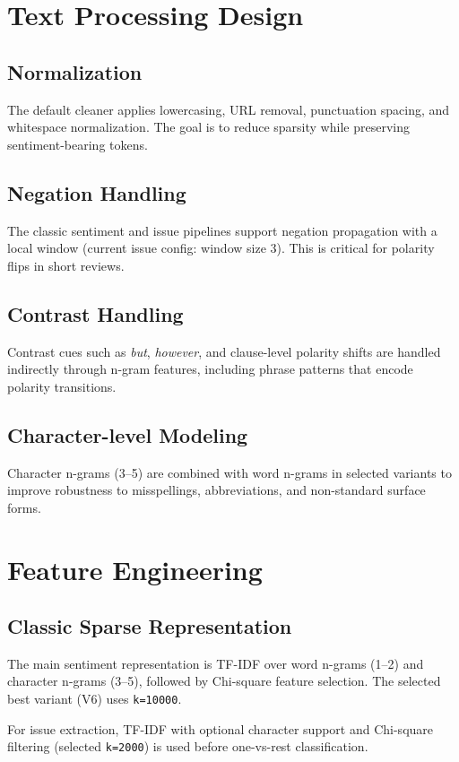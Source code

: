 \documentclass[12pt,a4paper]{article}
\begin{document}
\section{Text Processing Design}
\subsection{Normalization}
The default cleaner applies lowercasing, URL removal, punctuation spacing, and whitespace normalization. The goal is to reduce sparsity while preserving sentiment-bearing tokens.

\subsection{Negation Handling}
The classic sentiment and issue pipelines support negation propagation with a local window (current issue config: window size 3). This is critical for polarity flips in short reviews.

\subsection{Contrast Handling}
Contrast cues such as \textit{but}, \textit{however}, and clause-level polarity shifts are handled indirectly through n-gram features, including phrase patterns that encode polarity transitions.

\subsection{Character-level Modeling}
Character n-grams (3--5) are combined with word n-grams in selected variants to improve robustness to misspellings, abbreviations, and non-standard surface forms.

\section{Feature Engineering}
\subsection{Classic Sparse Representation}
The main sentiment representation is TF-IDF over word n-grams (1--2) and character n-grams (3--5), followed by Chi-square feature selection. The selected best variant (V6) uses \texttt{k=10000}.

For issue extraction, TF-IDF with optional character support and Chi-square filtering (selected \texttt{k=2000}) is used before one-vs-rest classification.
\end{document}
